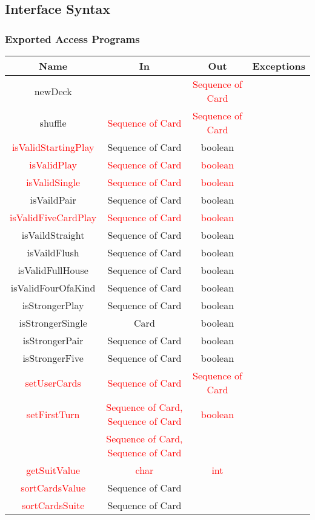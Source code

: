 \documentclass[12pt, titlepage]{article}
\begin{document}
\subsection{Interface Syntax}
\subsubsection{Exported Access Programs}
\begin{tabular}[pos]{|c|c|c|c|}
\hline
\textbf{Name}& \textbf{In} & \textbf{Out} & \textbf{Exceptions} \\ \hline
newDeck & ~ & \textcolor{red}{Sequence of Card} & ~ \\ \hline
shuffle & \textcolor{red}{Sequence of Card} & \textcolor{red}{Sequence of Card} & ~ \\ \hline
\textcolor{red}{isValidStartingPlay} & Sequence of Card & boolean & ~ \\ \hline
\textcolor{red}{isValidPlay} & \textcolor{red}{Sequence of Card} & \textcolor{red}{boolean} & ~ \\ \hline
\textcolor{red}{isValidSingle} & \textcolor{red}{Sequence of Card} & \textcolor{red}{boolean} & ~ \\ \hline
isVaildPair & Sequence of Card & boolean & ~ \\ \hline
\textcolor{red}{isValidFiveCardPlay} & \textcolor{red}{Sequence of Card} & \textcolor{red}{boolean} & ~ \\ \hline
isVaildStraight & Sequence of Card & boolean & ~\\ \hline
isVaildFlush & Sequence of Card & boolean & ~ \\ \hline
isValidFullHouse &  Sequence of Card & boolean & ~ \\ \hline
isValidFourOfaKind &  Sequence of Card & boolean & ~ \\ \hline
isStrongerPlay & Sequence of Card & boolean & ~ \\ \hline
isStrongerSingle & Card & boolean & ~ \\ \hline
isStrongerPair & Sequence of Card& boolean & ~ \\ \hline
isStrongerFive & Sequence of Card & boolean & ~ \\ \hline
\textcolor{red}{setUserCards} & \textcolor{red}{Sequence of Card} & \textcolor{red}{Sequence of Card} & ~\\ \hline
\textcolor{red}{setFirstTurn} & \textcolor{red}{Sequence of Card, Sequence of Card} & \textcolor{red}{boolean} & ~ \\ 
~ & \textcolor{red}{Sequence of Card, Sequence of Card} & ~ & ~\\ \hline
\textcolor{red}{getSuitValue} & \textcolor{red}{char} & \textcolor{red}{int} & ~ \\ \hline
\textcolor{red}{sortCardsValue} & Sequence of Card & ~ & ~\\ \hline
\textcolor{red}{sortCardsSuite} & Sequence of Card & ~ & ~ \\ \hline
\end{tabular}
\end{document}
